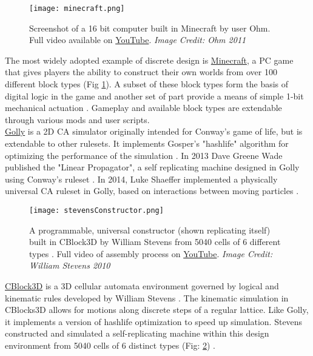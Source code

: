 {\begin{figure}
  \texttt{[image: minecraft.png]}
  \caption{Screenshot of a 16 bit computer built in Minecraft by user Ohm.  Full video available on \href{https://www.youtube.com/watch?v=KzrFzkb3A4o}{YouTube}. \textit{Image Credit: Ohm 2011}}
  \label{fig:minecraft}
\end{figure}

The most widely adopted example of discrete design is \href{https://minecraft.net/}{Minecraft}, a PC game that gives players the ability to construct their own worlds from over 100 different block types (Fig \ref{fig:minecraft}).  A subset of these block types form the basis of digital logic in the game and another set of part provide a means of simple 1-bit mechanical actuation \cite{MinecraftWik2016}.  Gameplay and available block types are extendable through various mods and user scripts.
\\

\href{http://golly.sourceforge.net/}{Golly} is a 2D CA simulator originally intended for Conway's game of life, but is extendable to other rulesets.  It implements Gosper's "hashlife" algorithm for optimizing the performance of the simulation \cite{Gosper1984}.  In 2013 Dave Greene Wade published the "Linear Propagator", a self replicating machine designed in Golly using Conway's ruleset \cite{Greene2013a}.  In 2014, Luke Shaeffer implemented a physically universal CA ruleset in Golly, based on interactions between moving particles \cite{Shaffer2014}.\\

\begin{figure}
  \texttt{[image: stevensConstructor.png]}
  \caption{A programmable, universal constructor (shown replicating itself) built in CBlock3D by William Stevens from 5040 cells of 6 different types \cite{Stevens2009b}.  Full video of assembly process on  \href{https://www.youtube.com/watch?v=PBXO_6Jn1fs}{YouTube}. \textit{Image Credit: William Stevens 2010}}
  \label{fig:stevensConstructor}
\end{figure}
\href{https://www.youtube.com/watch?feature=player_embedded&v=PBXO_6Jn1fs}{CBlock3D} is a 3D cellular automata environment governed by logical and kinematic rules developed by William Stevens \cite{Stevens2007} \cite{Stevens2009}.  The kinematic simulation in CBlocks3D allows for motions along discrete steps of a regular lattice.  Like Golly, it implements a version of hashlife optimization \cite{Stevens2010} to speed up simulation.  Stevens constructed and simulated a self-replicating machine within this design environment from 5040 cells of 6 distinct types (Fig: \ref{fig:stevensConstructor}) \cite{Stevens2009b}.
\\

}
